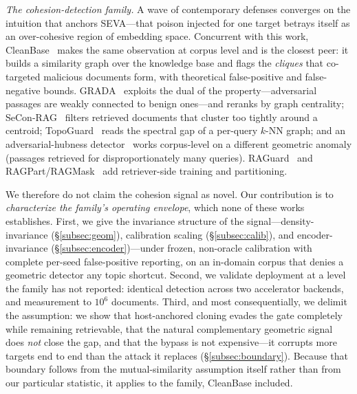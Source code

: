 \documentclass[10pt,journal,compsoc]{IEEEtran}
\begin{document}
\emph{The cohesion-detection family.} A wave of contemporary defenses converges on the
intuition that anchors SEVA---that poison injected for one target betrays itself as an
over-cohesive region of embedding space. Concurrent with this work, CleanBase~\cite{cleanbase}
makes the same observation at corpus level and is the closest peer: it builds a similarity graph
over the knowledge base and flags the \emph{cliques} that co-targeted malicious documents form,
with theoretical false-positive and false-negative bounds. GRADA~\cite{grada} exploits the dual
of the property---adversarial passages are weakly connected to benign ones---and reranks by graph
centrality; SeCon-RAG~\cite{secon} filters retrieved documents that cluster too tightly around a
centroid; TopoGuard~\cite{topoguard} reads the spectral gap of a per-query $k$-NN graph; and an
adversarial-hubness detector~\cite{hubness} works corpus-level on a different geometric anomaly
(passages retrieved for disproportionately many queries). RAGuard~\cite{raguard} and
RAGPart/RAGMask~\cite{ragpart} add retriever-side training and partitioning.

We therefore do not claim the cohesion signal as novel. Our contribution is to
\emph{characterize the family's operating envelope}, which none of these works establishes.
First, we give the invariance structure of the signal---density-invariance
(\S\ref{subsec:geom}), calibration scaling (\S\ref{subsec:calib}), and encoder-invariance
(\S\ref{subsec:encoder})---under frozen, non-oracle calibration with complete per-seed
false-positive reporting, on an in-domain corpus that denies a geometric detector any topic
shortcut. Second, we validate deployment at a level the family has not reported: identical
detection across two accelerator backends, and measurement to $10^6$ documents. Third, and most consequentially, we delimit the assumption:
we show that host-anchored cloning evades the gate completely while remaining retrievable, that
the natural complementary geometric signal does \emph{not} close the gap, and that the bypass is
not expensive---it corrupts more targets end to end than the attack it replaces
(\S\ref{subsec:boundary}). Because that
boundary follows from the mutual-similarity assumption itself rather than from our particular
statistic, it applies to the family, CleanBase included.
\end{document}
